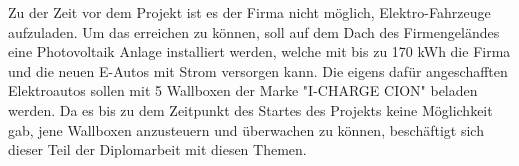 Zu der Zeit vor dem Projekt ist es der Firma nicht möglich, 
Elektro-Fahrzeuge aufzuladen. Um das erreichen zu können, 
soll auf dem Dach des Firmengeländes eine Photovoltaik Anlage 
installiert werden, welche mit bis zu 170 kWh die Firma und die 
neuen E-Autos mit Strom versorgen kann. Die eigens dafür angeschafften 
Elektroautos sollen mit 5 Wallboxen der Marke "I-CHARGE CION" beladen 
werden. Da es bis zu dem Zeitpunkt des Startes des Projekts keine 
Möglichkeit gab, jene Wallboxen anzusteuern und überwachen zu können, 
beschäftigt sich dieser Teil der Diplomarbeit mit diesen Themen. 
